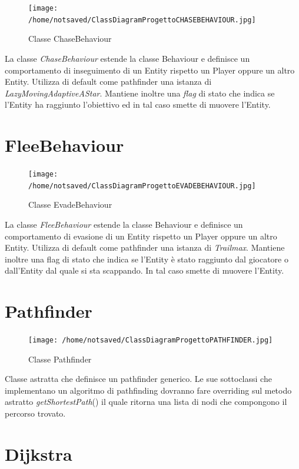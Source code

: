 \documentclass[12pt]{book}
\begin{document}
\begin{figure}[H]
\centering
\texttt{[image: /home/notsaved/ClassDiagramProgettoCHASEBEHAVIOUR.jpg]}
\caption{Classe ChaseBehaviour}
\label{classchase}
\end{figure}

La classe \emph{ChaseBehaviour} estende la classe Behaviour e definisce un comportamento di inseguimento di un Entity rispetto un Player oppure un altro Entity. Utilizza di default come pathfinder una istanza di \emph{LazyMovingAdaptiveAStar}. Mantiene inoltre una \emph{flag} di stato che indica se l'Entity ha raggiunto l'obiettivo ed in tal caso smette di muovere l'Entity.

\section{FleeBehaviour}

\begin{figure}[htp]
\centering
\texttt{[image: /home/notsaved/ClassDiagramProgettoEVADEBEHAVIOUR.jpg]}
\caption{Classe EvadeBehaviour}
\label{classevade}
\end{figure}

La classe \emph{FleeBehaviour} estende la classe Behaviour e definisce un comportamento di evasione di un Entity rispetto un Player oppure un altro Entity. Utilizza di default come pathfinder una istanza di \emph{Trailmax}. Mantiene inoltre una flag di stato che indica se l'Entity \`e stato raggiunto dal giocatore o dall'Entity dal quale si sta scappando. In tal caso smette di muovere l'Entity.

\section{Pathfinder}

\begin{figure}[H]
\centering
\texttt{[image: /home/notsaved/ClassDiagramProgettoPATHFINDER.jpg]}
\caption{Classe Pathfinder}
\label{classpathfind}
\end{figure}

Classe astratta che definisce un pathfinder generico. Le sue sottoclassi che implementano un algoritmo di pathfinding dovranno fare overriding sul metodo astratto \emph{getShortestPath}() il quale ritorna una lista di nodi che compongono il percorso trovato.

\section{Dijkstra}
\end{document}
